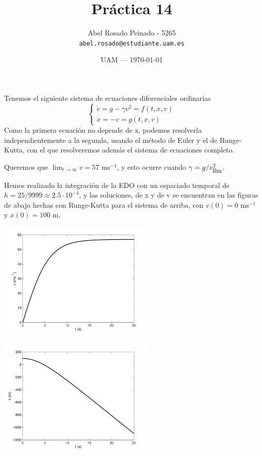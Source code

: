 \documentclass{article}
\title{Práctica 14} %
\author{Abel Rosado Peinado - 5265\\ \texttt{abel.rosado@estudiante.uam.es}} %
\date{UAM --- \today} %
\begin{document}
\maketitle %
\noindent Tenemos el siguiente sistema de ecuaciones diferenciales ordinarias
\[\left\{\begin{matrix}
	\dot{v} = g-\gamma v^2 = f(t,x,v) \\ \dot{x} = -v = g(t,x,v)
\end{matrix}\right.\]
Como la primera ecuación no depende de x, podemos resolverla independientemente a la segunda, usando el método de Euler y el de Runge-Kutta, con el que resolveremos además el sistema de ecuaciones completo.

Queremos que $\lim_{t\rightarrow \infty}v = 57$ ms$^{-1}$, y esto ocurre cuando $\gamma = g/v_{\mbox{\small lím}}^2$.

Hemos realizado la integración de la EDO con un espaciado temporal de $h=25/9999 \approx 2.5 \cdot 10^{-4}$, y las soluciones, de x y de v se encuentran en las figuras de abajo hechas con Runge-Kutta para el sistema de arriba, con $v(0) = 0$ ms$^{-1}$ y $x(0) = 100$ m.

\begin{minipage}{8cm}
	\centering
	\includegraphics[width=7.5cm]{untitled3.png}
  \end{minipage}%
  \begin{minipage}{8cm}
	\centering
	\includegraphics[width=7.5cm]{untitled2.png}
  \end{minipage}
\end{document}
